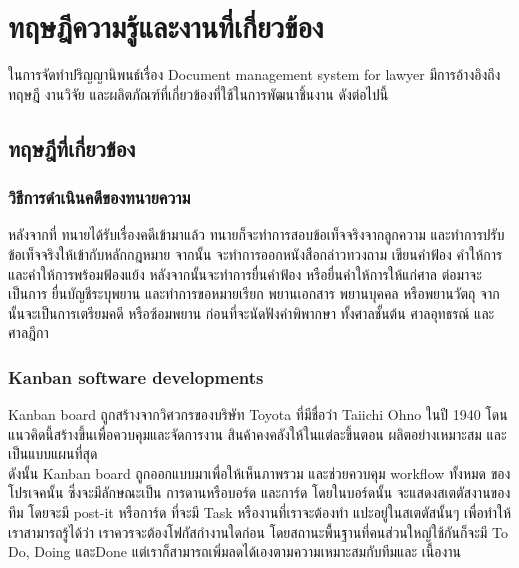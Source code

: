 \documentclass[12pt,oneside,openright,a4paper]{cpe-thai-project}
\begin{document}
\chapter{ทฤษฎีความรู้และงานที่เกี่ยวข้อง}

\hspace*{1cm}ในการจัดทําปริญญานิพนธ์เรื่อง Document management system for lawyer มีการอ้างอิงถึงทฤษฎี งานวิจัย และผลิตภัณฑ์ที่เกี่ยวข้องที่ใช้ในการพัฒนาชิ้นงาน ดังต่อไปนี้

\section{ทฤษฎีที่เกี่ยวข้อง}

\subsection{วิธีการดำเนินคดีของทนายความ} 
\hspace*{1cm}หลังจากที่ ทนายได้รับเรื่องคดีเข้ามาแล้ว ทนายก็จะทำการสอบข้อเท็จจริงจากลูกความ และทำการปรับข้อเท็จจริงให้เข้ากับหลักกฎหมาย จากนั้น จะทำการออกหนังสือกล่าวทวงถาม เขียนคำฟ้อง คำให้การ และคำให้การพร้อมฟ้องแย้ง หลังจากนั้นจะทำการยื่นคำฟ้อง หรือยื่นคำให้การให้แก่ศาล ต่อมาจะเป็นการ ยื่นบัญชีระบุพยาน และทำการขอหมายเรียก พยานเอกสาร พยานบุคคล หรือพยานวัตถุ จากนั้นจะเป็นการเตรียมคดี หรือซ้อมพยาน ก่อนที่จะนัดฟังคำพิพากษา ทั้งศาลชั้นต้น ศาลอุทธรณ์ และศาลฎีกา 

\subsection{Kanban software developments} 
\hspace*{1cm}Kanban board ถูกสร้างจากวิศวกรของบริษัท Toyota ที่มีชื่อว่า Taiichi Ohno ในปี 1940 โดนแนวคิดนี้สร้างขึ้นเพื่อควบคุมและจัดการงาน สินค้าคงคลังให้ในแต่ละขึ้นตอน ผลิตอย่างเหมาะสม และเป็นแบบแผนที่สุด\\
\hspace*{1cm}ดังนั้น Kanban board ถูกออกแบบมาเพื่อให้เห็นภาพรวม และช่วยควบคุม workflow ทั้งหมด ของโปรเจคนั้น ซึ่งจะมีลักษณะเป็น การดานหรือบอร์ด และการ์ด โดยในบอร์ดนั้น จะแสดงสเตตัสงานของทีม โดยจะมี post-it หรือการ์ด ที่จะมี Task หรืองานที่เราจะต้องทำ แปะอยู่ในสเตตัสนั้นๆ เพื่อทำให้เราสามารถรู้ได้ว่า เราควรจะต้องโฟกัสกำงานใดก่อน โดยสถานะพื้นฐานที่คนส่วนใหญ่ใช้กันก็จะมี To Do, Doing และDone แต่เราก็สามารถเพิ่มลดได้เองตามความเหมาะสมกับทีมและ เนื้องาน
\end{document}
